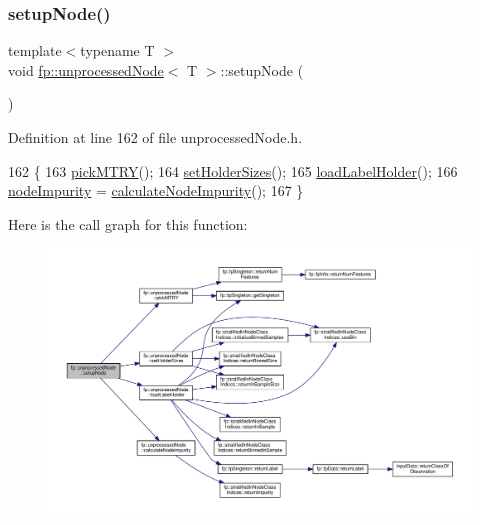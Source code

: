 \subsubsection{\texorpdfstring{setup\+Node()}{setupNode()}}
{\footnotesize\ttfamily template$<$typename T $>$ \\
void \hyperlink{classfp_1_1unprocessedNode}{fp\+::unprocessed\+Node}$<$ T $>$\+::setup\+Node (\begin{DoxyParamCaption}{ }\end{DoxyParamCaption})\hspace{0.3cm}{\ttfamily [inline]}}



Definition at line 162 of file unprocessed\+Node.\+h.


\begin{DoxyCode}
162                                        \{
163                     \hyperlink{classfp_1_1unprocessedNode_a5302bdd3ad2b0de3e2fcd8ed1bf58f61}{pickMTRY}();
164                     \hyperlink{classfp_1_1unprocessedNode_ae1aa4f8f868fe19c8e48d3fe1e5596a8}{setHolderSizes}();
165                     \hyperlink{classfp_1_1unprocessedNode_a7b286c437f8f73fb3431358c11898a82}{loadLabelHolder}();
166                     \hyperlink{classfp_1_1unprocessedNode_a5bb6906b09625f7893bf0ffd512b1714}{nodeImpurity} = \hyperlink{classfp_1_1unprocessedNode_a0278b4dd8d905d38d75ced9a95839a12}{calculateNodeImpurity}();
167                 \}
\end{DoxyCode}
Here is the call graph for this function\+:\nopagebreak
\begin{figure}[H]
\begin{center}
\leavevmode
\includegraphics[width=350pt]{classfp_1_1unprocessedNode_a713ab68816b13b1a82d667ac6f1640d7_cgraph}
\end{center}
\end{figure}



